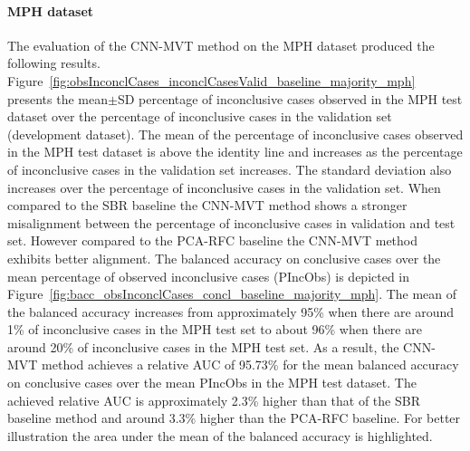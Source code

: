 
\paragraph{MPH dataset}

The evaluation of the CNN-MVT method on the MPH dataset produced the following results.
Figure~\ref{fig:obsInconclCases_inconclCasesValid_baseline_majority_mph} presents
the mean$\pm$SD percentage of inconclusive cases observed in the MPH test dataset 
over the percentage of inconclusive cases in the validation set (development dataset).
The mean of the percentage of inconclusive cases observed in the MPH test dataset
is above the identity line 
and increases as the percentage of inconclusive cases in the validation set increases.
The standard deviation also increases over the percentage of inconclusive cases in the validation set.
When compared to the SBR baseline the CNN-MVT method shows a stronger misalignment between 
the percentage of inconclusive cases in validation and test set. 
However compared to the PCA-RFC baseline the CNN-MVT method exhibits better alignment.
The balanced accuracy on conclusive cases over the mean percentage of observed inconclusive cases (PIncObs) is depicted 
in Figure~\ref{fig:bacc_obsInconclCases_concl_baseline_majority_mph}.
The mean of the balanced accuracy increases from approximately 95\% 
when there are around 1\% of inconclusive cases in the MPH test set to about 96\% 
when there are around 20\% of inconclusive cases in the MPH test set.
As a result, the CNN-MVT method achieves a relative AUC of 95.73\% for the mean balanced accuracy on conclusive cases 
over the mean PIncObs in the MPH test dataset.
The achieved relative AUC is approximately 2.3\% higher than that of the SBR baseline method 
and around 3.3\% higher than the PCA-RFC baseline.
For better illustration the area under the mean of the balanced accuracy is highlighted.


